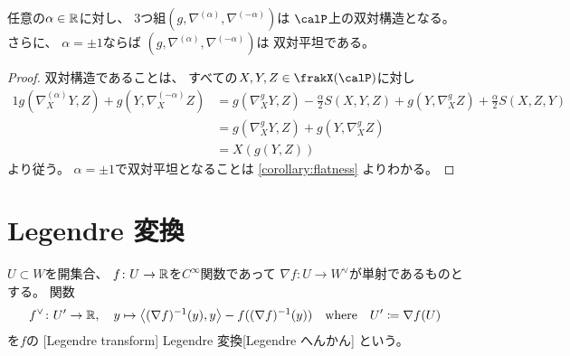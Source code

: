 \documentclass[report]{jlreq}
\begin{document}
\begin{theorem}
    任意の$\alpha \in \mathbb{R}$に対し、
    3つ組$(g, \nabla^{(\alpha)}, \nabla^{(-\alpha)})$は
    $\calP$上の双対構造となる。
    さらに、
    $\alpha = \pm 1$ならば
    $(g, \nabla^{(\alpha)}, \nabla^{(-\alpha)})$は
    双対平坦である。
\end{theorem}

\begin{proof}
    双対構造であることは、
    すべての$X, Y, Z \in \frakX(\calP)$に対し
    \begin{alignat}{1}
        g(\nabla^{(\alpha)}_X Y, Z)
            + g(Y, \nabla^{(-\alpha)}_X Z)
            &=
                g(\nabla^{g}_X Y, Z)
                - \frac{\alpha}{2} S(X, Y, Z)
                + g(Y, \nabla^{g}_X Z)
                + \frac{\alpha}{2} S(X, Z, Y)
                \\
            &=
                g(\nabla^{g}_X Y, Z)
                + g(Y, \nabla^{g}_X Z)
                \\
            &=
                X(g(Y, Z))
    \end{alignat}
    より従う。
    $\alpha = \pm 1$で双対平坦となることは
    \cref{corollary:flatness}
    よりわかる。
\end{proof}


%
\section{Legendre 変換}


\begin{definition}[Legendre 変換]
    $U \subset W$を開集合、
    $f \colon U \to \mathbb{R}$を$C^\infty$関数であって
    $\nabla f \colon U \to W^\vee$が単射であるものとする。
    関数
    \begin{equation}
        f^\vee \colon U' \to \mathbb{R},
            \quad
            y
            \mapsto
            \left\langle{(\nabla f)^{-1}(y)},{y}\right\rangle - f((\nabla f)^{-1}(y))
            \quad
            \text{where}
            \quad
            U' \coloneqq \nabla f(U)
    \end{equation}
    を$f$の
    [Legendre transform]
        {Legendre 変換}[Legendre へんかん]
    という。
\end{definition}
\end{document}
